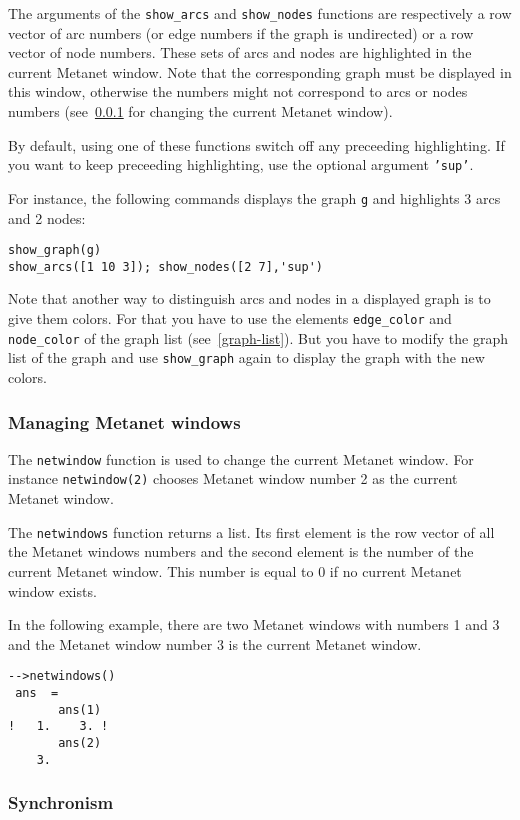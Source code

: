 \documentclass[11pt]{article}
\newcommand{\func}[1]{\texttt{#1}}
\begin{document}
The arguments of the \func{show\_arcs} and
\func{show\_nodes} functions are respectively a row vector of arc numbers (or
edge numbers if the graph is undirected) or a row vector of node
numbers. These sets of arcs and nodes are highlighted in the
current Metanet window. Note that the corresponding graph must be displayed in
this window, otherwise the numbers might not correspond to arcs or
nodes numbers (see~\ref{manage} for changing the current Metanet window).

By default, using one of these functions switch off any preceeding
highlighting. If you want to keep preceeding highlighting, use the
optional argument \texttt{'sup'}.

For instance, the following commands displays the graph \texttt{g} and
highlights 3 arcs and 2 nodes:
\begin{verbatim}
show_graph(g)
show_arcs([1 10 3]); show_nodes([2 7],'sup')
\end{verbatim}

Note that another way to distinguish arcs and nodes in a displayed
graph is to give them colors. For that you have to use the elements 
\texttt{edge\_color} and \texttt{node\_color} of the graph list
(see~\ref{graph-list}). But you have to modify the graph list of the
graph and use \func{show\_graph} again to display the graph with
the new colors.

\subsubsection{Managing Metanet windows}\label{manage}

The \func{netwindow} function is used to change the current Metanet
window. 
For instance \texttt{netwindow(2)} chooses Metanet window
number 2 as the current Metanet window.

The \func{netwindows} function returns a list. Its first element is
the row vector of 
all the Metanet windows numbers and the second element is the number of the 
current Metanet window. This number is equal to 0 if no current Metanet
window exists.

In the following example, there are two Metanet windows with numbers 1
and 3 and the  Metanet window number 3 is the current Metanet window.
\begin{verbatim}
-->netwindows()
 ans  =
       ans(1)
!   1.    3. !
       ans(2)
    3.  
\end{verbatim}

\subsubsection{Synchronism}\label{synchro}
\end{document}
